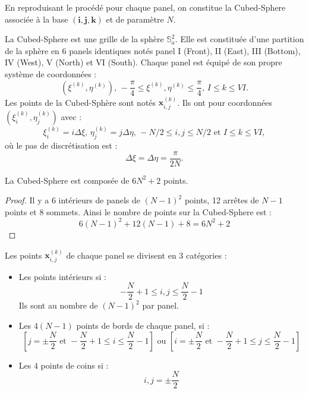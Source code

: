 En reproduisant le procédé pour chaque panel, on constitue la Cubed-Sphere associée à la base $(\mathbf{i},\mathbf{j},\mathbf{k})$ et de paramètre $N$.

\begin{definition}
La Cubed-Sphere est une grille de la sphère $\mathbb{S}_a^2$. Elle est constituée d'une partition de la sphère en 6 panels identiques notés panel I (Front), II (East), III (Bottom), IV (West), V (North) et VI (South). Chaque panel est équipé de son propre système de coordonnées :
\begin{equation}
\left( \xi^{(k)}, \eta^{(k)} \right) \text{, } -\dfrac{\pi}{4} \leq \xi^{(k)}, \eta^{(k)} \leq \dfrac{\pi}{4} \text{, } I \leq k \leq VI.
\end{equation}
Les points de la Cubed-Sphère sont notés $\mathbf{x}_{i,j}^{(k)}$. Ils ont pour coordonnées $\left( \xi_i^{(k)}, \eta_j^{(k)}  \right)$ avec :
\begin{equation}
\xi_i^{(k)} = i \Delta \xi \text{, } \eta_j^{(k)} = j \Delta \eta \text{, } -N/2 \leq i, j \leq N/2 \text{ et } I \leq k \leq VI,
\end{equation}
où le pas de discrétisation est :
\begin{equation}
\Delta \xi = \Delta \eta = \dfrac{\pi}{2 N}.
\end{equation}
\end{definition}

\begin{proposition}
La Cubed-Sphere est composée de $6N^2 +2$ points.
\end{proposition}

\begin{proof}
Il y a 6 intérieurs de panels de $(N-1)^2$ points, 12 arrêtes de $N-1$ points et 8 sommets. Ainsi le nombre de points sur la Cubed-Sphere est :
$$
6 (N-1)^2 + 12 (N-1)+8=6N^2+2
$$
\end{proof}

Les points $\mathbf{x}_{i,j}^{(k)}$ de chaque panel se divisent en 3 catégories :
\begin{itemize}
\item Les points intérieurs si :
\begin{equation}
- \dfrac{N}{2}+1 \leq i,j \leq \dfrac{N}{2}-1
\end{equation}
Ils sont au nombre de $(N-1)^2$ par panel.
\item Les $4(N-1)$ points de bords de chaque panel, si :
\begin{equation}
\left[ j=\pm \dfrac{N}{2} \text{ et } - \dfrac{N}{2}+1 \leq i \leq \dfrac{N}{2}-1 \right] \text{ ou } \left[ i=\pm \dfrac{N}{2} \text{ et } - \dfrac{N}{2}+1 \leq j \leq \dfrac{N}{2}-1 \right]
\end{equation}
\item Les $4$ points de coins si :
\begin{equation}
i, j = \pm \dfrac{N}{2}
\end{equation}
\end{itemize}



